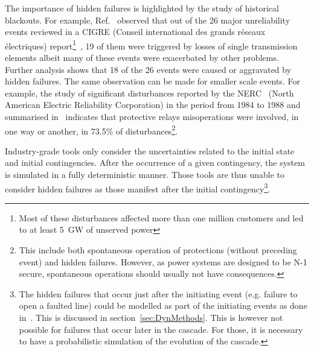 The importance of hidden failures is highlighted by the study of historical blackouts. For example, Ref.~\cite{CascadingMethodoAndChallenges} observed that out of the 26 major unreliability events reviewed in a CIGRE (Conseil international des grands réseaux électriques) report\footnote{Most of these disturbances affected more than one million customers and led to at least 5~GW of unserved power}~\cite{majorBlackouts}, 19 of them were triggered by losses of single transmission elements albeit many of these events were exacerbated by other problems. Further analysis shows that 18 of the 26 events were caused or aggravated by hidden failures. The same observation can be made for smaller scale events. For example, the study of significant disturbances reported by the NERC~\cite{NERCDisturbancesReport} (North American Electric Reliability Corporation) in the period from 1984 to 1988 and summarised in~\cite{ZoneVulnerability} indicates that protective relays misoperations were involved, in one way or another, in 73.5\% of disturbances\footnote{This include both spontaneous operation of protections (without preceding event) and hidden failures. However, as power systems are designed to be N-1 secure, spontaneous operations should usually not have consequences.}.


Industry-grade tools only consider the uncertainties related to the initial state and initial contingencies. After the occurrence of a given contingency, the system is simulated in a fully deterministic manner. Those tools are thus unable to consider hidden failures as those manifest after the initial contingency\footnote{The hidden failures that occur just after the initiating event (e.g. failure to open a faulted line) could be modelled as part of the initiating events as done in~\cite{Haarla, GridPSA}. This is discussed in section~\ref{sec:DynMethods}. This is however not possible for failures that occur later in the cascade. For those, it is necessary to have a probabilistic simulation of the evolution of the cascade.}.

